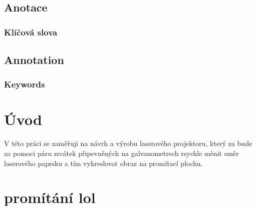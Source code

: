 \documentclass{template/socthesis}
\author{Šimon Hrouda}
\begin{document}
\maketitle



\pagestyle{empty}

\section*{Anotace}


\subsection*{Klíčová slova}


\vspace{20mm}

\section*{Annotation}


\subsection*{Keywords}


\newpage
\pagestyle{plain}

\tableofcontents %

\setcounter{figure}{0}
\setcounter{table}{0}
\newpage

\chapter*{Úvod}
V této práci se zaměřuji na návrh a výrobu laserového projektoru, který za bude za pomoci páru zrcátek připevněných na galvanometrech rsychle měnit směr laserového paprsku a tím vykreslovat obraz na promítací plochu.


\newpage

\chapter{promítání lol}
\end{document}
